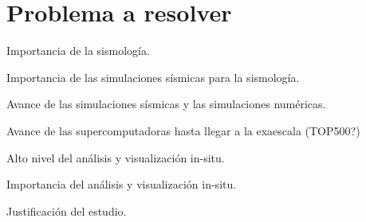 \section{Problema a resolver}
Importancia de la sismología.

Importancia de las simulaciones sísmicas para la sismología.

Avance de las simulaciones sísmicas y las simulaciones numéricas.

Avance de las supercomputadoras hasta llegar a la exaescala (TOP500?)

Alto nivel del análisis y visualización in-situ.

Importancia del análisis y visualización in-situ.

Justificación del estudio.


